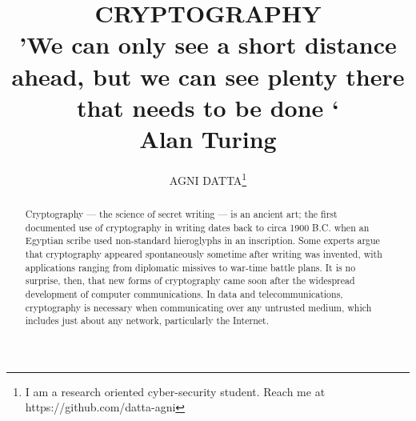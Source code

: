 \documentclass[british]{report}
\providecommand{\printnomenclature}{\printglossary}
\begin{document}
\title{\textbf{\huge CRYPTOGRAPHY}
\\
{\normalsize \textquoteright We can only see a short distance ahead, but we can see plenty there that needs to be done \textquoteleft}
\\
{\normalsize Alan Turing} }
\author{AGNI DATTA\thanks{I am a research oriented cyber-security student. Reach me at https://github.com/datta-agni}}
\maketitle
\begin{abstract}
	{\normalsize{}Cryptography --- the science of secret writing ---
		is an ancient art; the first documented use of cryptography in writing
		dates back to circa 1900 B.C. when an Egyptian scribe used non-standard
		hieroglyphs in an inscription. Some experts argue that cryptography
		appeared spontaneously sometime after writing was invented, with applications
		ranging from diplomatic missives to war-time battle plans. It is no
		surprise, then, that new forms of cryptography came soon after the
		widespread development of computer communications. In data and telecommunications,
		cryptography is necessary when communicating over any untrusted medium,
		which includes just about any network, particularly the Internet.}{\normalsize\par}
\end{abstract}
\tableofcontents{}

\settowidth{\nomlabelwidth}{Decryption Algorithm}
\printnomenclature{}




\end{document}
